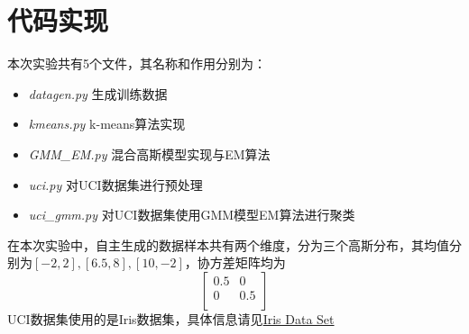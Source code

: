 \documentclass[a4paper,11pt,UTF8]{ctexart}
\begin{document}
\section{代码实现}
本次实验共有5个文件，其名称和作用分别为：
\begin{itemize}
  \item \emph{datagen.py} \quad 生成训练数据
  \item \emph{kmeans.py} \quad k-means算法实现
  \item \emph{GMM\_EM.py} \quad 混合高斯模型实现与EM算法
  \item \emph{uci.py} \quad 对UCI数据集进行预处理
  \item \emph{uci\_gmm.py} \quad 对UCI数据集使用GMM模型EM算法进行聚类
\end{itemize}
在本次实验中，自主生成的数据样本共有两个维度，分为三个高斯分布，其均值分别为$[-2,2],[6.5,8],[10,-2]$，协方差矩阵均为$$
\begin{bmatrix}
	0.5 & 0 \\
	0 & 0.5 \\
\end{bmatrix}
$$
UCI数据集使用的是Iris数据集，具体信息请见\href{https://archive.ics.uci.edu/ml/datasets/Iris/}{Iris Data Set}
\end{document}
